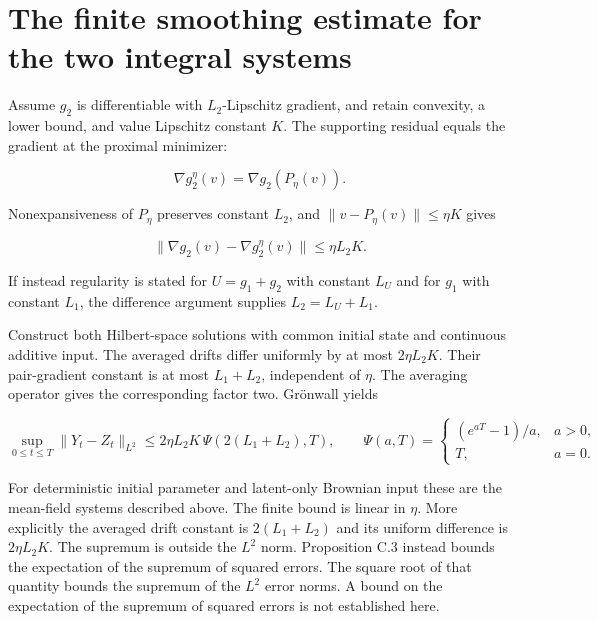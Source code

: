 \documentclass[11pt,a4paper]{article}
\begin{document}
\section{\texorpdfstring{The finite smoothing estimate for the two integral systems}{The finite smoothing estimate for the two integral systems}}


Assume \(g_2\) is differentiable with \(L_2\)-Lipschitz gradient, and retain convexity, a lower bound, and value Lipschitz constant \(K\). The supporting residual equals the gradient at the proximal minimizer:

\[
\nabla g_2^\eta(v)=\nabla g_2(P_\eta(v)).
\]

Nonexpansiveness of \(P_\eta\) preserves constant \(L_2\), and \(\|v-P_\eta(v)\|\le\eta K\) gives

\[
\|\nabla g_2(v)-\nabla g_2^\eta(v)\|\le\eta L_2K.
\]

If instead regularity is stated for \(U=g_1+g_2\) with constant \(L_U\) and for \(g_1\) with constant \(L_1\), the difference argument supplies \(L_2=L_U+L_1\).



Construct both Hilbert-space solutions with common initial state and continuous additive input. The averaged drifts differ uniformly by at most \(2\eta L_2K\). Their pair-gradient constant is at most \(L_1+L_2\), independent of \(\eta\). The averaging operator gives the corresponding factor two. Grönwall yields

\[
\sup_{0\le t\le T}\|Y_t-Z_t\|_{L^2}
 \le 2\eta L_2K\,\Psi(2(L_1+L_2),T),
\qquad
\Psi(a,T)=\begin{cases}(e^{aT}-1)/a,&a>0,\\T,&a=0.\end{cases}
\]

For deterministic initial parameter and latent-only Brownian input these are the mean-field systems described above. The finite bound is linear in \(\eta\). More explicitly the averaged drift constant is \(2(L_1+L_2)\) and its uniform difference is \(2\eta L_2K\). The supremum is outside the \(L^2\) norm. Proposition C.3 instead bounds the expectation of the supremum of squared errors. The square root of that quantity bounds the supremum of the \(L^2\) error norms. A bound on the expectation of the supremum of squared errors is not established here.
\end{document}
